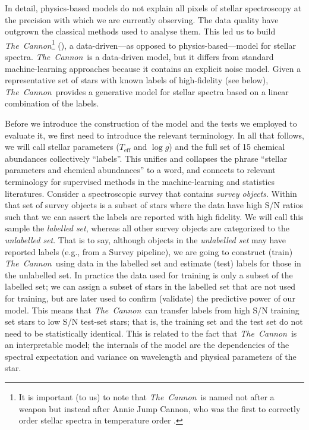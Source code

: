 \documentclass[12pt,preprint]{aastex}
\newcommand{\project}[1]{\textsl{#1}}
\newcommand{\TheCannon}{\project{The~Cannon}}
\newcommand{\logg}{\log g}
\newcommand{\Teff}{T_{\mathrm{eff}}}
\begin{document}
In detail, physics-based models do not explain all pixels of stellar 
spectroscopy at the precision with which we are currently observing.  The data
quality have outgrown the classical methods used to analyse them.  This led us 
to build \TheCannon\footnote{It is important (to us) to note that \TheCannon\ 
is named not after a weapon but instead after Annie Jump Cannon, who was the 
first to correctly order stellar spectra in temperature order \citep[and who did
so by looking at the data, and without any use of physics-based models, see][]
{Cannon_1911}.} (\citealt{tc}), a data-driven---as opposed to 
physics-based---model for stellar spectra.  \TheCannon\ is a data-driven model, 
but it differs from standard machine-learning approaches because it contains an 
explicit noise model. Given a representative set of stars with known labels of 
high-fidelity (see below), \TheCannon\ provides a generative model for stellar 
spectra based on a linear combination of the labels.  


Before we introduce the construction of the model and the tests we employed to
evaluate it, we first need to introduce the relevant terminology.  In all that 
follows, we will call stellar parameters ($\Teff$ and $\logg$) and the full set
of 15 chemical abundances collectively ``labels''.  This unifies and collapses 
the phrase ``stellar parameters and chemical abundances'' to a word, and 
connects to relevant terminology for supervised methods in the machine-learning
and statistics literatures.  Consider a spectroscopic survey that contains 
\emph{survey objects}.  Within that set of survey objects is a subset of stars 
where the data have high S/N ratios such that we can assert the labels are 
reported with high fidelity.  We will call this sample the \emph{labelled set}, 
whereas all other survey objects are categorized to the \emph{unlabelled set}.  
That is to say, although objects in the \emph{unlabelled set} may have reported 
labels (e.g., from a Survey pipeline), we are going to construct (train) 
\TheCannon\ using data in the labelled set and estimate (test) labels for those
in the unlabelled set.  In practice the data used for training is only a subset 
of the labelled set; we can assign a subset of stars in the labelled set that 
are not used for training, but are later used to confirm (validate) the 
predictive power of our model.  This means that \TheCannon\ can transfer labels
from high S/N training set stars to low S/N test-set stars; that is, the 
training set and the test set do not need to be statistically identical.  This 
is related to the fact that \TheCannon\ is an interpretable model; the internals
of the model are the dependencies of the spectral expectation and variance on
wavelength and physical parameters of the star. 
\end{document}
